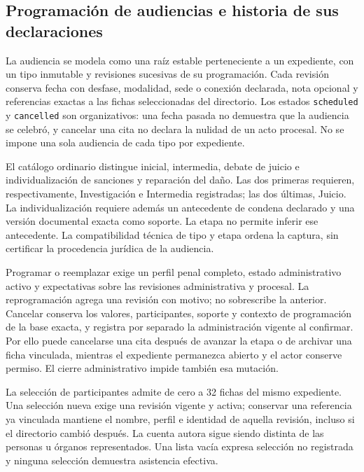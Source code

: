 \subsection{Programación de audiencias e historia de sus declaraciones}\label{sec:diseno-audiencias}

La audiencia se modela como una raíz estable perteneciente a un expediente, con un tipo inmutable y revisiones sucesivas de su programación. Cada revisión conserva fecha con desfase, modalidad, sede o conexión declarada, nota opcional y referencias exactas a las fichas seleccionadas del directorio. Los estados \texttt{scheduled} y \texttt{cancelled} son organizativos: una fecha pasada no demuestra que la audiencia se celebró, y cancelar una cita no declara la nulidad de un acto procesal. No se impone una sola audiencia de cada tipo por expediente.

El cat\'alogo ordinario distingue inicial, intermedia, debate de juicio e individualización de sanciones y reparación del daño. Las dos primeras requieren, respectivamente, Investigación e Intermedia registradas; las dos últimas, Juicio. La individualización requiere además un antecedente de condena declarado y una versión documental exacta como soporte. La etapa no permite inferir ese antecedente. La compatibilidad técnica de tipo y etapa ordena la captura, sin certificar la procedencia jurídica de la audiencia.

Programar o reemplazar exige un perfil penal completo, estado administrativo activo y expectativas sobre las revisiones administrativa y procesal. La reprogramación agrega una revisión con motivo; no sobrescribe la anterior. Cancelar conserva los valores, participantes, soporte y contexto de programación de la base exacta, y registra por separado la administración vigente al confirmar. Por ello puede cancelarse una cita después de avanzar la etapa o de archivar una ficha vinculada, mientras el expediente permanezca abierto y el actor conserve permiso. El cierre administrativo impide también esa mutación.

La selección de participantes admite de cero a 32 fichas del mismo expediente. Una selección nueva exige una revisión vigente y activa; conservar una referencia ya vinculada mantiene el nombre, perfil e identidad de aquella revisión, incluso si el directorio cambió después. La cuenta autora sigue siendo distinta de las personas u órganos representados. Una lista vacía expresa selección no registrada y ninguna selección demuestra asistencia efectiva.

